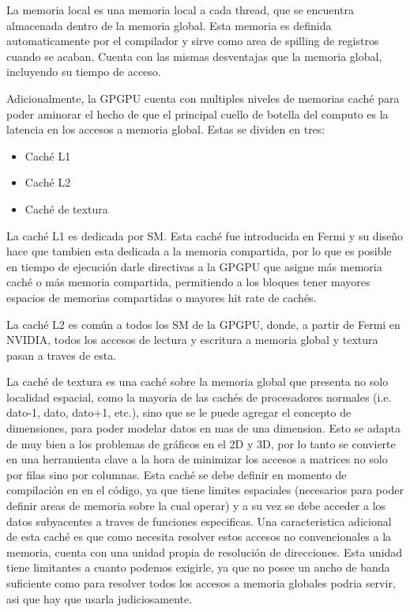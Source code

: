 La memoria local es una memoria local a cada thread, que se encuentra almacenada dentro de la
memoria global. Esta memoria es definida automaticamente por el compilador y sirve como area de spilling
de registros cuando se acaban. Cuenta con las mismas desventajas que la memoria global, incluyendo
su tiempo de acceso.

Adicionalmente, la GPGPU cuenta con multiples niveles de memorias cach\'e para poder aminorar el hecho
de que el principal cuello de botella del computo es la latencia en los accesos a memoria global.
Estas se dividen en tres:

\begin{itemize}
  \item Cach\'e L1
  \item Cach\'e L2
  \item Cach\'e de textura
\end{itemize}

La cach\'e L1 es dedicada por SM. Esta cach\'e fue introducida en Fermi y su dise\~no hace que
tambien esta dedicada a la memoria compartida, por lo que es posible en tiempo de ejecuci\'on
darle directivas a la GPGPU que asigne m\'as memoria cach\'e o m\'as memoria compartida,
permitiendo a los bloques tener mayores espacios de memorias compartidas o mayores hit rate de cach\'es.

La cach\'e L2 es com\'un a todos los SM de la GPGPU, donde, a partir de Fermi en NVIDIA, todos
los accesos de lectura y escritura a memoria global y textura pasan a traves de esta. ~\cite{NvidiaFermi}

La cach\'e de textura es una cach\'e sobre la memoria global que presenta no solo localidad espacial,
como la mayoria de las cach\'es de procesadores normales (i.e. dato-1, dato, dato+1, etc.), sino que se le
puede agregar el concepto de dimensiones, para poder modelar datos en mas de una dimension.
Esto se adapta de muy bien a los problemas de gr\'aficos en el 2D y 3D, por lo tanto se convierte
en una herramienta clave a la hora de minimizar los accesos a matrices
no solo por filas sino por columnas. Esta cach\'e se debe definir en momento de compilaci\'on en
en el c\'odigo, ya que tiene limites espaciales (necesarios para poder definir areas de memoria
sobre la cual operar) y a su vez se debe acceder a los datos subyacentes a traves de funciones especificas. Una caracteristica adicional
de esta cach\'e es que como necesita resolver estos accesos no convencionales a la memoria, cuenta
con una unidad propia de resoluci\'on de direcciones. Esta unidad tiene limitantes a cuanto podemos
exigirle, ya que no posee un ancho de banda suficiente como para resolver todos los
accesos a memoria globales podria servir, asi que hay que usarla judiciosamente.


